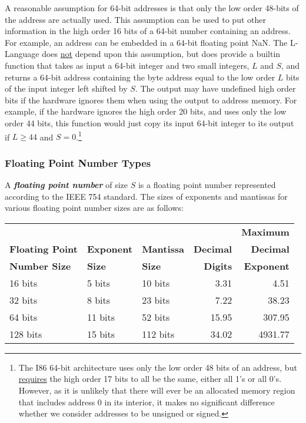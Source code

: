 \documentclass[12pt]{article}
\newcommand{\key}[1]{{\bf \em #1}\index{#1}}
\begin{document}
A reasonable assumption for 64-bit addresses is that only the low
order 48-bits of the address are actually used.  This assumption can
be used to put other information in the high order 16 bits
of a 64-bit number containing an address.  For example, an address
can be embedded in a 64-bit floating point NaN.  The L-Language does
\underline{not} depend upon this assumption, but does provide a builtin function
that takes as input a 64-bit integer and two small integers, $L$ and $S$,
and returns a 64-bit address containing
the byte address equal to the low order $L$ bits of the input integer
left shifted by $S$.  The output may have undefined high order bits if
the hardware ignores them when using the output to address memory.
For example, if the hardware ignores the high order 20 bits, and uses only the
low order 44 bits,
this function would just copy its input 64-bit integer to its output
if $L\geq 44$ and $S=0$.\footnote{The I86 64-bit architecture
uses only the low order 48 bits of an address, but \underline{requires}
the high order 17 bits to all be the same, either all 1's or all 0's.
However, as it is unlikely that there will ever be an allocated memory region
that includes address 0 in its interior, it makes no significant difference
whether we consider addresses to be unsigned or signed.}

\subsubsection{Floating Point Number Types}

A \key{floating point number} of size $S$ is a floating point number
represented according to the IEEE 754 standard.  The sizes of exponents
and mantissas for various floating point number sizes are as follows:

\begin{center}
\begin{tabular}{l@{~~~~~~}l@{~~~~~~}l@{~~~~~~}r@{~~~~~~}r}
                   &              &              &             & \bf Maximum \\
\bf Floating Point & \bf Exponent & \bf Mantissa & \bf Decimal & \bf Decimal\\
\bf Number Size    & \bf Size     & \bf Size     & \bf Digits  & \bf Exponent
\\[2ex]
16 bits & 5 bits & 10 bits & 3.31 & 4.51 \\
32 bits & 8 bits & 23 bits & 7.22 & 38.23 \\
64 bits & 11 bits & 52 bits & 15.95 & 307.95 \\
128 bits & 15 bits & 112 bits & 34.02 & 4931.77 \\
\end{tabular}
\end{center}
\end{document}
